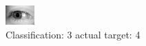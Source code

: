 \begin{figure}[h!]
\begin{center}
\includegraphics[width=0.60\columnwidth]{figures/ID3262_class_3_target_4.png}
\end{center}
\caption{ Classification: 3 actual target: 4}
\label{fig:ID3262_class_3_target_4}
\end{figure}
